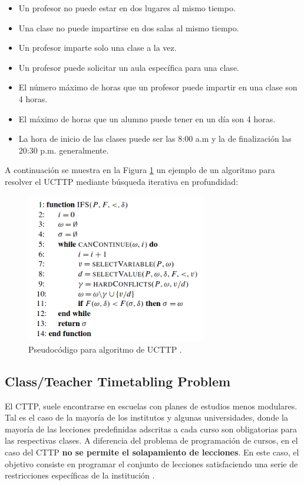 \begin{itemize}
    \item Un profesor no puede estar en dos lugares al mismo tiempo.
    \item Una clase no puede impartirse en dos salas al mismo tiempo.
    \item Un profesor imparte solo una clase a la vez.
    \item Un profesor puede solicitar un aula específica para una clase.
    \item El número máximo de horas que un profesor puede impartir en una clase son 4 horas.
    \item El máximo de horas que un alumno puede tener en un día son 4 horas.
    \item La hora de inicio de las clases puede ser las 8:00 a.m y la de finalización las 20:30 p.m. generalmente.
\end{itemize}
A continuación se muestra en la Figura \ref{fig:UCTTP} un ejemplo de un algoritmo para resolver el UCTTP mediante búsqueda iterativa en profundidad:

\begin{figure}[H]
    \centering
    \includegraphics[width=0.7\textwidth]{./imagenes/UCTTP_Algoritmo.png}
    \caption{Pseudocódigo para algoritmo de UCTTP \cite{Rudova2011}.}
    \label{fig:UCTTP}
\end{figure}


\subsection{Class/Teacher Timetabling Problem}

El CTTP, suele encontrarse en escuelas con planes de estudios menos modulares. Tal es el caso de la mayoría de los institutos y algunas universidades, donde la mayoría de las lecciones predefinidas adscritas a cada curso son obligatorias para las respectivas clases. A diferencia del problema de programación de cursos, en el caso del CTTP \textbf{no se permite el solapamiento de lecciones}. En este caso, el objetivo consiste en programar el conjunto de lecciones satisfaciendo una serie de restricciones específicas de la institución \cite{doi:10.1504/IJOR.2024.139234}.\newline

